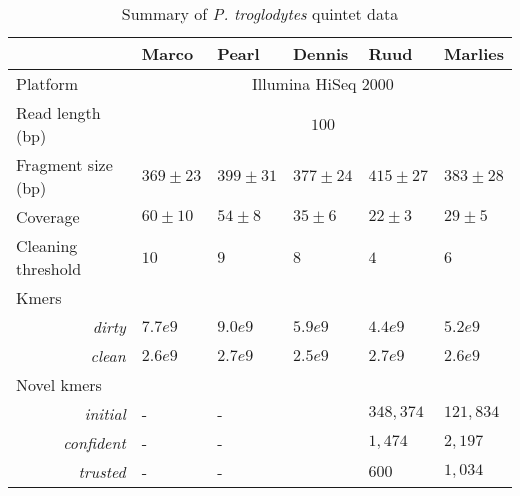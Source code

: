 \begin{table}[]
\centering
\caption{Summary of \textit{P. troglodytes} quintet data}
\label{tbl:pedstats}
\begin{tabular}{@{}llllll@{}}
\toprule
                                       & Marco           & Pearl           & Dennis         & Ruud            & Marlies         \\ \midrule
Platform                               & \multicolumn{5}{c}{Illumina HiSeq 2000}                                                \\
Read length (bp)                       & \multicolumn{5}{c}{$100$}                                                              \\
Fragment size (bp)                     & $369 \pm 23$    & $399 \pm 31$    & $377 \pm 24$   & $415 \pm 27$    & $383 \pm 28$    \\
Coverage                               & $60 \pm 10$     & $54 \pm 8$      & $35 \pm 6$     & $22 \pm 3$      & $29 \pm 5$      \\
Cleaning threshold                     & $10$            & $9$             & $8$            & $4$             & $6$             \\
Kmers                                  &                 &                 &                &                 &                 \\
\multicolumn{1}{r}{\textit{dirty}}     & $7.7e9$         & $9.0e9$         & $5.9e9$        & $4.4e9$         & $5.2e9$         \\
\multicolumn{1}{r}{\textit{clean}}     & $2.6e9$         & $2.7e9$         & $2.5e9$        & $2.7e9$         & $2.6e9$         \\
Novel kmers                            &                 &                 &                &                 &                 \\
\multicolumn{1}{r}{\textit{initial}}   & -               & -               &                & $348,374$       & $121,834$       \\
\multicolumn{1}{r}{\textit{confident}} & -               & -               &                & $1,474$         & $2,197$         \\
\multicolumn{1}{r}{\textit{trusted}}   & -               & -               &                & $600$           & $1,034$         \\ \bottomrule
\end{tabular}
\end{table}

